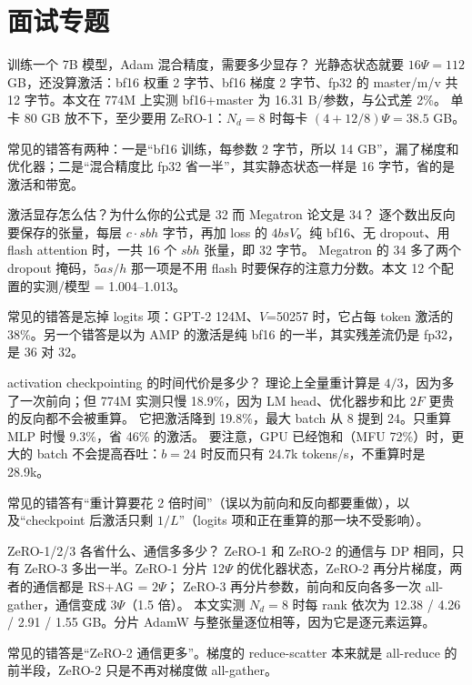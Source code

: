 \documentclass[11pt,a4paper]{ctexart}
\begin{document}
\section{面试专题}

\begin{iqbox}{训练一个 7B 模型，Adam 混合精度，需要多少显存？}
光静态状态就要 $16\Psi = 112$ GB，还没算激活：bf16 权重 2 字节、bf16 梯度 2 字节、fp32 的 master/m/v 共 12 字节。本文在 774M 上实测 bf16+master 为 16.31 B/参数，与公式差 2\%。
单卡 80 GB 放不下，至少要用 ZeRO-1：$N_d=8$ 时每卡 $(4+12/8)\Psi=38.5$ GB。
\par 常见的错答有两种：一是“bf16 训练，每参数 2 字节，所以 14 GB”，漏了梯度和优化器；二是“混合精度比 fp32 省一半”，其实静态状态一样是 16 字节，省的是激活和带宽。
\end{iqbox}

\begin{iqbox}{激活显存怎么估？为什么你的公式是 32 而 Megatron 论文是 34？}
逐个数出反向要保存的张量，每层 $c\cdot sbh$ 字节，再加 loss 的 $4bsV$。纯 bf16、无 dropout、用 flash attention 时，一共 16 个 $sbh$ 张量，即 32 字节。
Megatron 的 34 多了两个 dropout 掩码，$5as/h$ 那一项是不用 flash 时要保存的注意力分数。本文 12 个配置的实测/模型 = 1.004--1.013。
\par 常见的错答是忘掉 logits 项：GPT-2 124M、$V$=50257 时，它占每 token 激活的 38\%。另一个错答是以为 AMP 的激活是纯 bf16 的一半，其实残差流仍是 fp32，是 36 对 32。
\end{iqbox}

\begin{iqbox}{activation checkpointing 的时间代价是多少？}
理论上全量重计算是 $4/3$，因为多了一次前向；但 774M 实测只慢 18.9\%，因为 LM head、优化器步和比 $2F$ 更贵的反向都不会被重算。
它把激活降到 19.8\%，最大 batch 从 8 提到 24。只重算 MLP 时慢 9.3\%，省 46\% 的激活。
要注意，GPU 已经饱和（MFU 72\%）时，更大的 batch 不会提高吞吐：$b=24$ 时反而只有 24.7k tokens/s，不重算时是 28.9k。
\par 常见的错答有“重计算要花 2 倍时间”（误以为前向和反向都要重做），以及“checkpoint 后激活只剩 $1/L$”（logits 项和正在重算的那一块不受影响）。
\end{iqbox}

\begin{iqbox}{ZeRO-1/2/3 各省什么、通信多多少？}
ZeRO-1 和 ZeRO-2 的通信与 DP 相同，只有 ZeRO-3 多出一半。ZeRO-1 分片 12$\Psi$ 的优化器状态，ZeRO-2 再分片梯度，两者的通信都是 RS+AG = $2\Psi$；
ZeRO-3 再分片参数，前向和反向各多一次 all-gather，通信变成 $3\Psi$（1.5 倍）。
本文实测 $N_d=8$ 时每 rank 依次为 12.38 / 4.26 / 2.91 / 1.55 GB。分片 AdamW 与整张量逐位相等，因为它是逐元素运算。
\par 常见的错答是“ZeRO-2 通信更多”。梯度的 reduce-scatter 本来就是 all-reduce 的前半段，ZeRO-2 只是不再对梯度做 all-gather。
\end{iqbox}
\end{document}
